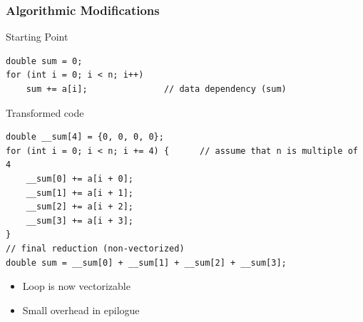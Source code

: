 \documentclass[xcolor={x11names,svgnames}]{beamer}
\begin{document}

\begin{frame}[fragile=singleslide]
  \frametitle{Algorithmic Modifications }

  \begin{block}{Starting Point}

\begin{verbatim}
double sum = 0;
for (int i = 0; i < n; i++)
    sum += a[i];               // data dependency (sum)
\end{verbatim}
  \end{block}

  \begin{exampleblock}{Transformed code}

\begin{verbatim}
double __sum[4] = {0, 0, 0, 0};
for (int i = 0; i < n; i += 4) {      // assume that n is multiple of 4
    __sum[0] += a[i + 0];
    __sum[1] += a[i + 1];
    __sum[2] += a[i + 2];
    __sum[3] += a[i + 3];
}
// final reduction (non-vectorized)
double sum = __sum[0] + __sum[1] + __sum[2] + __sum[3];
\end{verbatim}

    \begin{itemize}
    \item Loop is now vectorizable
    \item Small overhead in epilogue
    \end{itemize}
  \end{exampleblock}
\end{frame}

\end{document}
